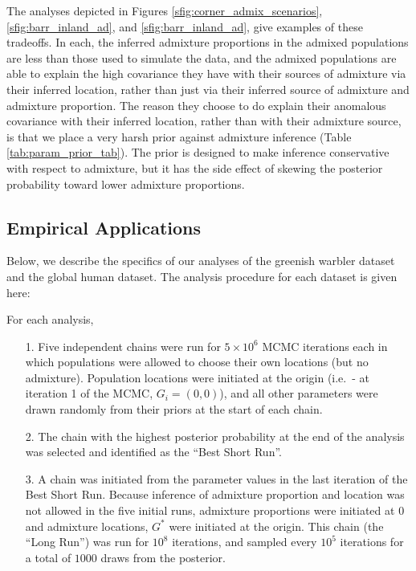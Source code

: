 \documentclass[12pt]{article}
\newcommand{\admixsource}[1]{{$G^{*}$}}
\begin{document}
The analyses depicted in Figures \ref{sfig:corner_admix_scenarios}, 
\ref{sfig:barr_inland_ad}, and
\ref{sfig:barr_inland_ad}, 
give examples of these tradeoffs.
In each, the inferred admixture proportions in the admixed populations are less than those used to simulate the data,
and the admixed populations are able to explain the high covariance they have with their sources of admixture via their inferred location,
rather than just via their inferred source of admixture and admixture proportion.  
The reason they choose to do explain their anomalous covariance with their inferred location,
rather than with their admixture source,
is that we place a very harsh prior against admixture inference (Table \ref{tab:param_prior_tab}).
The prior is designed to make inference conservative with respect to admixture,
but it has the side effect of skewing the posterior probability toward lower admixture proportions.

\subsection*{Empirical Applications}
Below, we describe the specifics of our analyses of the greenish warbler dataset and the global human dataset.  The analysis procedure for each dataset is given here:

For each analysis,
\begin{itemize}
\item[1.] Five independent chains were run for $5\times 10^6$ MCMC iterations each in which populations were allowed to choose their own locations (but no admixture).  Population locations were initiated at the origin (i.e.\ - at iteration 1 of the MCMC, $G_i = (0,0)$), and all other parameters were drawn randomly from their priors at the start of each chain.  
\item[2.]The chain with the highest posterior probability at the end of the analysis was selected and identified as the ``Best Short Run''.
\item[3.] A chain was initiated from the parameter values in the last iteration of the Best Short Run.  Because inference of admixture proportion and location was not allowed in the five initial runs, admixture proportions were initiated at 0 and admixture locations, \admixsource{G} were initiated at the origin.  This  chain (the ``Long Run'') was run for $10^8$ iterations, and sampled every $10^5$ iterations for a total of $1000$ draws from the posterior.
\end{itemize}
\end{document}
